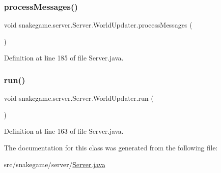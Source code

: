 \subsubsection{\texorpdfstring{process\+Messages()}{processMessages()}}
{\footnotesize\ttfamily void snakegame.\+server.\+Server.\+World\+Updater.\+process\+Messages (\begin{DoxyParamCaption}{ }\end{DoxyParamCaption})}



Definition at line 185 of file Server.\+java.

\mbox{\label{classsnakegame_1_1server_1_1_server_1_1_world_updater_ab5b9d807315109ef40781908856852dd}} 
\subsubsection{\texorpdfstring{run()}{run()}}
{\footnotesize\ttfamily void snakegame.\+server.\+Server.\+World\+Updater.\+run (\begin{DoxyParamCaption}{ }\end{DoxyParamCaption})}



Definition at line 163 of file Server.\+java.



The documentation for this class was generated from the following file\+:\begin{DoxyCompactItemize}
\item 
src/snakegame/server/\mbox{\hyperlink{_server_8java}{Server.\+java}}\end{DoxyCompactItemize}
